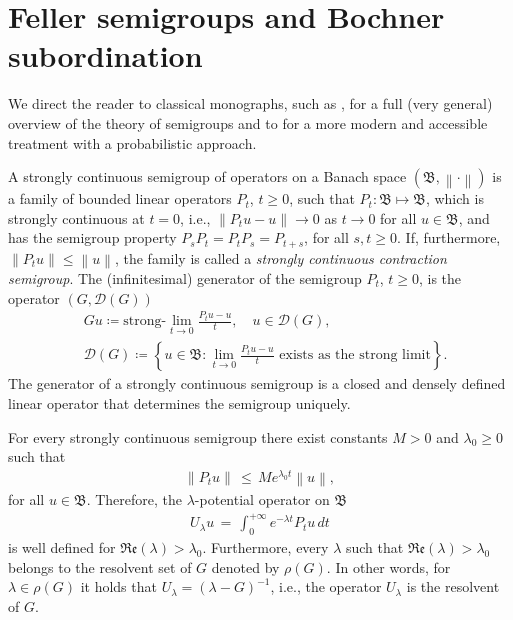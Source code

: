 \documentclass[reqno]{amsart}
\theoremstyle{remark}
\numberwithin{equation}{section} %
\newcommand{\DD}{\mathcal{D}}
\newcommand{\1}{\mathds{1}}
\begin{document}
	
	
	\section{Feller semigroups and Bochner subordination}
	\label{appendix_semigroups}
	We direct the reader to classical monographs, such as \cite{hille1996functional}, for a full (very general) overview of the theory of semigroups and to \cite{schillinglevy} for a more modern and accessible treatment with a probabilistic approach. 
	
	A strongly continuous semigroup of operators on a Banach space $(\mathfrak{B}, \left\| \cdot \right\|)$ is a family of bounded linear operators $P_t$, $t \geq 0$, such that $P_t:\mathfrak{B} \mapsto \mathfrak{B}$, which is strongly continuous at $t=0$, i.e., $\left\| P_tu-u \right\| \to 0$ as $t \to 0$ for all $u\in\mathfrak{B}$, and has the semigroup property $P_sP_t=P_tP_s=P_{t+s}$, for all $s,t \geq 0$. If, furthermore, $\left\| P_tu \right\| \leq \left\|u \right\|$, the family is called a \emph{strongly continuous contraction semigroup}. The (infinitesimal) generator of the semigroup $P_t$, $t\ge0$, is the operator $(G, \mathcal{D}(G))$
	\begin{align}
		&  Gu \coloneqq \text{strong-}\lim_{t \to 0} \frac{P_tu-u}{t},\quad u\in \DD(G), \\
		& \mathcal{D}(G) \coloneqq \left\lbrace u \in \mathfrak{B}: \lim_{t \to 0} \frac{P_tu-u}{t} \text{ exists as the strong limit} \right\rbrace.
	\end{align}
	The generator of a strongly continuous semigroup is a closed
	and densely defined linear operator that determines the semigroup uniquely. 
	
	For every strongly continuous semigroup there exist constants $M >0$ and $\lambda_0\geq0$ such that
	\begin{align}
		\left\|  P_t u \right\| \, \leq \, M e^{\lambda_0 t} \left\| u \right\|,
	\end{align}
	for all $u\in \mathfrak{B}$.
	Therefore, the $\lambda$-potential operator on $\mathfrak{B}$
	\begin{align}
		U_\lambda u \, = \, \int_0^{+\infty} e^{-\lambda t} P_tu \, dt
	\end{align}
	is well defined for $\mathfrak{Re}(\lambda) > \lambda_0$. Furthermore, every $\lambda$ such that $\mathfrak{Re} (\lambda) > \lambda_0$ belongs to the resolvent set of $G$ denoted by $\rho(G)$. In other words, for $\lambda \in \rho (G)$ it holds that $U_\lambda = (\lambda - G)^{-1}$, i.e., the operator $U_\lambda$ is the resolvent of $G$.
	
\end{document}
